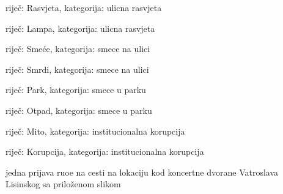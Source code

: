 \begin{packed_item}
\begin{packed_item}
					\item riječ: Rasvjeta, kategorija: ulicna rasvjeta
					\item riječ: Lampa, kategorija: ulicna rasvjeta
					\item riječ: Smeće, kategorija: smece na ulici
					\item riječ: Smrdi, kategorija: smece na ulici
					\item riječ: Park, kategorija: smece u parku
					\item riječ: Otpad, kategorija: smece u parku
					\item riječ: Mito, kategorija: institucionalna korupcija
					\item riječ: Korupcija, kategorija: institucionalna korupcija
				\end{packed_item}
				\item jedna prijava ruoe na cesti na lokaciju kod koncertne dvorane Vatroslava Lisinskog sa priloženom slikom
			\end{packed_item}
			
			\eject 